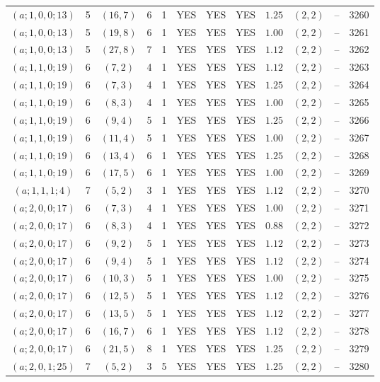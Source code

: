 \begin{longtable}{|c|c|c|c|c|c|c|c|c|c|c|c|}
$(a;1,0,0;13)$ & 5 & $(16,7)$ & 6 & 1 & YES & YES & YES & $1.25$ & $(2,2)$ & -- & 3260\\
$(a;1,0,0;13)$ & 5 & $(19,8)$ & 6 & 1 & YES & YES & YES & $1.00$ & $(2,2)$ & -- & 3261\\
$(a;1,0,0;13)$ & 5 & $(27,8)$ & 7 & 1 & YES & YES & YES & $1.12$ & $(2,2)$ & -- & 3262\\
$(a;1,1,0;19)$ & 6 & $(7,2)$ & 4 & 1 & YES & YES & YES & $1.12$ & $(2,2)$ & -- & 3263\\
$(a;1,1,0;19)$ & 6 & $(7,3)$ & 4 & 1 & YES & YES & YES & $1.25$ & $(2,2)$ & -- & 3264\\
$(a;1,1,0;19)$ & 6 & $(8,3)$ & 4 & 1 & YES & YES & YES & $1.00$ & $(2,2)$ & -- & 3265\\
$(a;1,1,0;19)$ & 6 & $(9,4)$ & 5 & 1 & YES & YES & YES & $1.25$ & $(2,2)$ & -- & 3266\\
$(a;1,1,0;19)$ & 6 & $(11,4)$ & 5 & 1 & YES & YES & YES & $1.00$ & $(2,2)$ & -- & 3267\\
$(a;1,1,0;19)$ & 6 & $(13,4)$ & 6 & 1 & YES & YES & YES & $1.25$ & $(2,2)$ & -- & 3268\\
$(a;1,1,0;19)$ & 6 & $(17,5)$ & 6 & 1 & YES & YES & YES & $1.00$ & $(2,2)$ & -- & 3269\\
$(a;1,1,1;4)$ & 7 & $(5,2)$ & 3 & 1 & YES & YES & YES & $1.12$ & $(2,2)$ & -- & 3270\\
$(a;2,0,0;17)$ & 6 & $(7,3)$ & 4 & 1 & YES & YES & YES & $1.00$ & $(2,2)$ & -- & 3271\\
$(a;2,0,0;17)$ & 6 & $(8,3)$ & 4 & 1 & YES & YES & YES & $0.88$ & $(2,2)$ & -- & 3272\\
$(a;2,0,0;17)$ & 6 & $(9,2)$ & 5 & 1 & YES & YES & YES & $1.12$ & $(2,2)$ & -- & 3273\\
$(a;2,0,0;17)$ & 6 & $(9,4)$ & 5 & 1 & YES & YES & YES & $1.12$ & $(2,2)$ & -- & 3274\\
$(a;2,0,0;17)$ & 6 & $(10,3)$ & 5 & 1 & YES & YES & YES & $1.00$ & $(2,2)$ & -- & 3275\\
$(a;2,0,0;17)$ & 6 & $(12,5)$ & 5 & 1 & YES & YES & YES & $1.12$ & $(2,2)$ & -- & 3276\\
$(a;2,0,0;17)$ & 6 & $(13,5)$ & 5 & 1 & YES & YES & YES & $1.12$ & $(2,2)$ & -- & 3277\\
$(a;2,0,0;17)$ & 6 & $(16,7)$ & 6 & 1 & YES & YES & YES & $1.12$ & $(2,2)$ & -- & 3278\\
$(a;2,0,0;17)$ & 6 & $(21,5)$ & 8 & 1 & YES & YES & YES & $1.25$ & $(2,2)$ & -- & 3279\\
$(a;2,0,1;25)$ & 7 & $(5,2)$ & 3 & 5 & YES & YES & YES & $1.25$ & $(2,2)$ & -- & 3280\\

\end{longtable}
